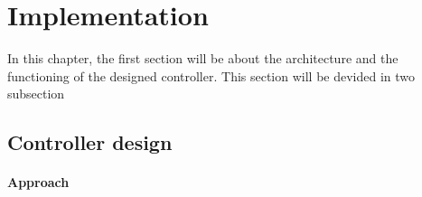 
\chapter{Implementation}
\label{chapter:Implementation}

In this chapter, the first section will be about the architecture and the functioning of the designed controller. This section will be devided in two subsection 
\section{Controller design}


\subsubsection{Approach}

